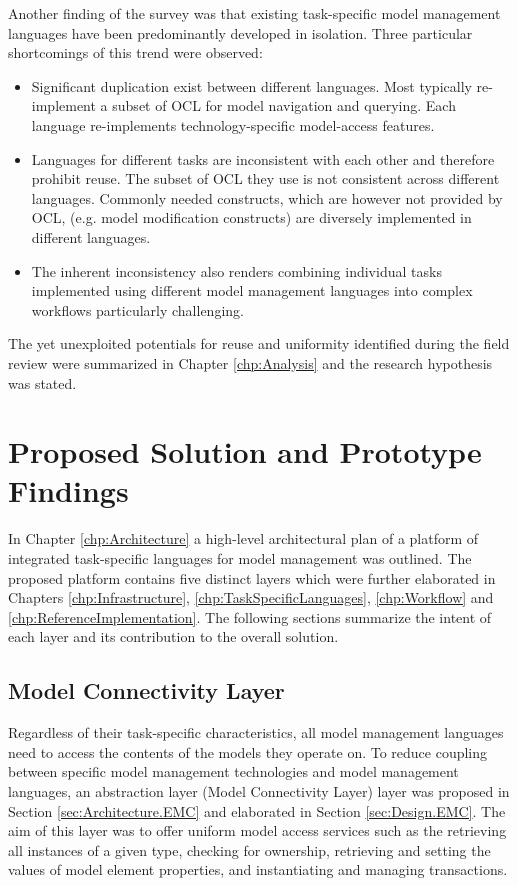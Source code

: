 Another finding of the survey was that existing task-specific model management languages have been predominantly developed in isolation. Three particular shortcomings of this trend were observed:

\begin{itemize}
	\item Significant duplication exist between different languages.
		\subitem Most typically re-implement a subset of OCL for model navigation and querying.
		\subitem Each language re-implements technology-specific model-access features.
	\item Languages for different tasks are inconsistent with each other and therefore prohibit reuse.
		\subitem The subset of OCL they use is not consistent across different languages.
		\subitem Commonly needed constructs, which are however not provided by OCL, (e.g. model modification constructs) are diversely implemented in different languages.
	\item The inherent inconsistency also renders combining individual tasks implemented using different model management languages into complex workflows particularly challenging.
\end{itemize}

The yet unexploited potentials for reuse and uniformity identified during the field review were summarized in Chapter \ref{chp:Analysis} and the research hypothesis was stated.

\section{Proposed Solution and Prototype Findings}
\label{sec:SolutionFindings}

In Chapter \ref{chp:Architecture} a high-level architectural plan of a platform of integrated task-specific languages for model management was outlined. The proposed platform contains five distinct layers which were further elaborated in Chapters \ref{chp:Infrastructure}, \ref{chp:TaskSpecificLanguages}, \ref{chp:Workflow} and \ref{chp:ReferenceImplementation}. The following sections summarize the intent of each layer and its contribution to the overall solution.

\subsection{Model Connectivity Layer}

Regardless of their task-specific characteristics, all model management languages need to access the contents of the models they operate on. To reduce coupling between specific model management technologies and model management languages, an abstraction layer (Model Connectivity Layer) layer was proposed in Section \ref{sec:Architecture.EMC} and elaborated in Section \ref{sec:Design.EMC}. The aim of this layer was to offer uniform model access services such as the retrieving all instances of a given type, checking for ownership, retrieving and setting the values of model element properties, and instantiating and managing transactions.

